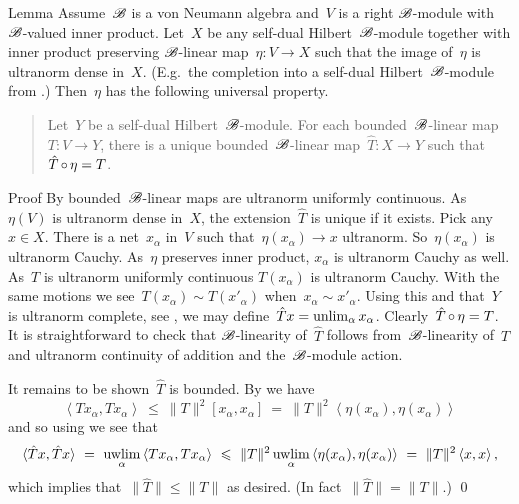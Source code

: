 \begin{parsec}%
\begin{point}{Lemma}%
Assume~$\mathscr{B}$ is a von Neumann algebra
    and~$V$ is a right $\mathscr{B}$-module
    with~$\mathscr{B}$-valued inner product.
Let~$X$ be any self-dual Hilbert~$\mathscr{B}$-module
    together with inner product preserving
    $\mathscr{B}$-linear map~$\eta\colon V \to X$
    such that the image of~$\eta$ is ultranorm dense in~$X$.
(E.g.~the completion into a self-dual Hilbert~$\mathscr{B}$-module
from .)
Then~$\eta$ has the following universal property.
\begin{quote}
Let~$Y$ be a self-dual Hilbert~$\mathscr{B}$-module.
For each bounded~$\mathscr{B}$-linear
    map~$T\colon V \to Y$,
    there is a unique bounded~$\mathscr{B}$-linear
    map~$\hat{T} \colon X \to Y$
    such that~$\hat{T} \mathop{\circ} \eta = T$.
\end{quote}
\begin{point}{Proof}%
By  bounded~$\mathscr{B}$-linear
    maps are ultranorm uniformly continuous.
As~$\eta(V)$ is ultranorm dense in~$X$,
    the extension~$\hat{T}$ is unique if it exists.
Pick any~$x \in X$.
There is a net~$x_\alpha$ in~$V$ such
    that~$\eta(x_\alpha) \to x$ ultranorm.
So~$\eta(x_\alpha)$ is ultranorm Cauchy.
As~$\eta$ preserves inner product,
    $x_\alpha$ is ultranorm Cauchy as well.
As~$T$ is ultranorm uniformly continuous
    $T(x_\alpha)$ is ultranorm Cauchy.
With the same motions we see~$T(x_\alpha) \sim T(x'_\alpha)$
    when~$x_\alpha \sim x'_\alpha$.
Using this and that~$Y$ is ultranorm complete, see ,
    we may define~$\hat{T} x = \unlim_\alpha x_\alpha$.
Clearly~$\hat{T}\mathop{\circ}\eta=T$.
It is straightforward to check
    that $\mathscr{B}$-linearity
    of~$\hat{T}$
    follows from~$\mathscr{B}$-linearity of~$T$
    and ultranorm continuity of addition and
        the~$\mathscr{B}$-module action.

It remains to be shown~$\hat{T}$ is bounded.
By   we have
\begin{equation*}
\left<T x_\alpha,T x_\alpha\right>
\ \leq\  \| T\|^2 [x_\alpha,x_\alpha]
\ =\  \|T\|^2 \left<\eta(x_\alpha),\eta(x_\alpha)\right>
\end{equation*}
and so using  we see that
\begin{equation*}
\langle\hat{T} x, \hat{T} x\rangle \ =\ 
\uwlim_\alpha \left<T x_\alpha, T x_\alpha\right>
            \ \leq \ \|T\|^2 \uwlim_\alpha \left<\eta(x_\alpha), \eta(x_\alpha)\right>
            \ =\  \|T\|^2 \left<x,x\right>,
\end{equation*}
which implies that~$\|\hat{T}\| \leq \|T\|$ as desired.
(In fact~$\|\hat{T}\| = \|T\|$.) \qed
\end{point}
\end{point}
\end{parsec}
